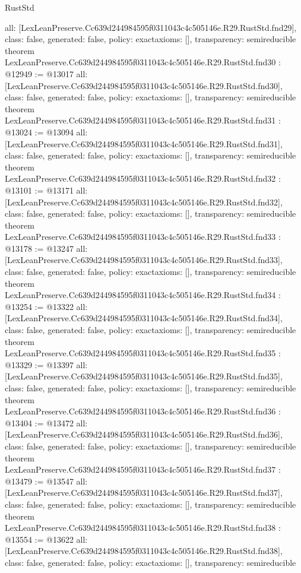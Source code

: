 \begin{lexlean}{RustStd}
\begin{coremodule}
{  all: [LexLeanPreserve.Cc639d244984595f0311043c4c505146e.R29.RustStd.fnd29],
  class: false,
  generated: false,
  policy: exact{axioms: []},
  transparency: semireducible
}
theorem LexLeanPreserve.Cc639d244984595f0311043c4c505146e.R29.RustStd.fnd30 : @12949 := @13017 {
  all: [LexLeanPreserve.Cc639d244984595f0311043c4c505146e.R29.RustStd.fnd30],
  class: false,
  generated: false,
  policy: exact{axioms: []},
  transparency: semireducible
}
theorem LexLeanPreserve.Cc639d244984595f0311043c4c505146e.R29.RustStd.fnd31 : @13024 := @13094 {
  all: [LexLeanPreserve.Cc639d244984595f0311043c4c505146e.R29.RustStd.fnd31],
  class: false,
  generated: false,
  policy: exact{axioms: []},
  transparency: semireducible
}
theorem LexLeanPreserve.Cc639d244984595f0311043c4c505146e.R29.RustStd.fnd32 : @13101 := @13171 {
  all: [LexLeanPreserve.Cc639d244984595f0311043c4c505146e.R29.RustStd.fnd32],
  class: false,
  generated: false,
  policy: exact{axioms: []},
  transparency: semireducible
}
theorem LexLeanPreserve.Cc639d244984595f0311043c4c505146e.R29.RustStd.fnd33 : @13178 := @13247 {
  all: [LexLeanPreserve.Cc639d244984595f0311043c4c505146e.R29.RustStd.fnd33],
  class: false,
  generated: false,
  policy: exact{axioms: []},
  transparency: semireducible
}
theorem LexLeanPreserve.Cc639d244984595f0311043c4c505146e.R29.RustStd.fnd34 : @13254 := @13322 {
  all: [LexLeanPreserve.Cc639d244984595f0311043c4c505146e.R29.RustStd.fnd34],
  class: false,
  generated: false,
  policy: exact{axioms: []},
  transparency: semireducible
}
theorem LexLeanPreserve.Cc639d244984595f0311043c4c505146e.R29.RustStd.fnd35 : @13329 := @13397 {
  all: [LexLeanPreserve.Cc639d244984595f0311043c4c505146e.R29.RustStd.fnd35],
  class: false,
  generated: false,
  policy: exact{axioms: []},
  transparency: semireducible
}
theorem LexLeanPreserve.Cc639d244984595f0311043c4c505146e.R29.RustStd.fnd36 : @13404 := @13472 {
  all: [LexLeanPreserve.Cc639d244984595f0311043c4c505146e.R29.RustStd.fnd36],
  class: false,
  generated: false,
  policy: exact{axioms: []},
  transparency: semireducible
}
theorem LexLeanPreserve.Cc639d244984595f0311043c4c505146e.R29.RustStd.fnd37 : @13479 := @13547 {
  all: [LexLeanPreserve.Cc639d244984595f0311043c4c505146e.R29.RustStd.fnd37],
  class: false,
  generated: false,
  policy: exact{axioms: []},
  transparency: semireducible
}
theorem LexLeanPreserve.Cc639d244984595f0311043c4c505146e.R29.RustStd.fnd38 : @13554 := @13622 {
  all: [LexLeanPreserve.Cc639d244984595f0311043c4c505146e.R29.RustStd.fnd38],
  class: false,
  generated: false,
  policy: exact{axioms: []},
  transparency: semireducible
}
\end{coremodule}
\end{lexlean}
